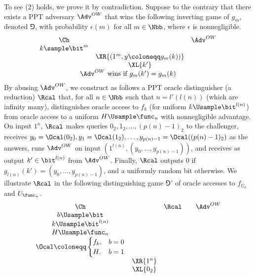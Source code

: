 \begin{answer}[a]
    To see (2) holds, we prove it by contradiction. Suppose to the contrary that there exists a PPT adversary $\Adv^{OW}$ that wins the following inverting game of $g_m$, denoted $\Game$, with probability $\epsilon(m)$ for all $m\in\Nbb$, where $\epsilon$ is nonnegligible.
    {
        \[
            \begin{array}{@{} c c c @{}}
            \Ch & & \Adv^{OW} \\
            k\sample \bit^m & & \\
            & \XR{(1^m, y\coloneqq g_m(k))} & \\
            & \XL{k'} & \\
            \multicolumn{3}{c}{\text{$\Adv^{OW}$ wins if $g_m(k') = g_m(k)$}}
            \end{array}
        \]
        \label{fig:p3-game1}
    }
    By abusing $\Adv^{OW}$, we construct as follows a PPT oracle distinguisher (a reduction) $\Rcal$ that, for all $n\in\Nbb$ such that $n=l'(l(n))$ (which are infinity many), distinguishes oracle access to $f_k$ (for uniform $k\Usample \bit^{l(n)}$) from oracle access to a uniform $H\Usample\func_n$ with nonnegligible advantage.
    On input $1^n$, $\Rcal$ makes queries $0_2,1_2,\ldots,(p(n)-1)_2$ to the challenger, receives $y_0=\Ocal(0_2),y_1=\Ocal(1_2),\ldots,y_{p(n)-1}=\Ocal((p(n)-1)_2)$ as the answers, runs $\Adv^{OW}$ on input $(1^{l(n)}, (y_0,\ldots,y_{p(n)-1}))$, and receives as output $k'\in\bit^{l(n)}$ from $\Adv^{OW}$. Finally, $\Rcal$ outputs $0$ if $g_{l(n)}(k')=(y_0,\ldots,y_{p(n)-1})$, and a uniformly  random bit otherwise. We illustrate $\Rcal$ in the following distinguishing game $\Game'$ of oracle accesses to $f_{U_n}$ and $U_{\func_n}$.
    {
        \[
            \begin{array}{@{} c c c c c@{}}
            \Ch & & \Rcal & & \Adv^{OW} \\
            b\Usample\bit & & & & \\
            k\Usample\bit^{l(n)} & & & & \\
            H\Usample \func_n & & & & \\
            \Ocal \coloneqq \begin{cases}
                f_{k}, &b=0\\
                H, &b=1
            \end{cases} & & & & \\
            & \XR{1^n} & &  & \\
            & \XL{0_2} & &  & \\

\end{array}\]}
\end{answer}
